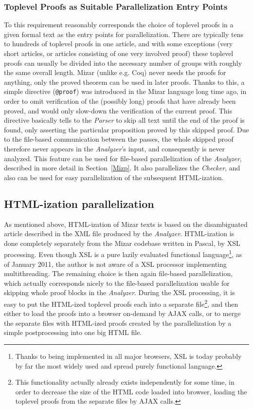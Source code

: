 \documentclass{llncs}
\begin{document}
\subsubsection{Toplevel Proofs as Suitable Parallelization Entry Points}
To this requirement reasonably corresponds the choice of toplevel
proofs in a given formal text as the entry points for
parallelization. There are typically tens to hundreds of toplevel
proofs in one article, and with some exceptions (very short articles,
or articles consisting of one very involved proof) these toplevel
proofs can usually be divided into the necessary number of groups with
roughly the same overall length. Mizar (unlike e.g. Coq) never needs
the proofs for anything, only the proved theorem can be used in later
proofs. Thanks to this, a simple directive ({\tt @proof}) was
introduced in the Mizar language long time ago, in order to omit
verification of the (possibly long) proofs that have already been
proved, and would only slow-down the verification of the current
proof. This directive basically tells to the \emph{Parser} to skip all
text until the end of the proof is found, only asserting the
particular proposition proved by this skipped proof. Due to the
file-based communication between the passes, the whole skipped proof
therefore never appears in the \emph{Analyzer}'s input, and
consequently is never analyzed. This feature can be used for 
file-based parallelization of the \emph{Analyzer}, described in more
detail in Section~\ref{Mizp}. It also parallelizes the \emph{Checker},
and also can be used for easy parallelization of the subsequent
HTML-ization.

\subsection{HTML-ization parallelization}
\label{HTML}
As mentioned above, HTML-ization of Mizar texts is based on the
disambiguated article described in the XML file produced by the
\emph{Analyzer}. HTML-ization is done completely separately from the
Mizar codebase written in Pascal, by XSL processing. Even though XSL
is a pure lazily evaluated functional language\footnote{Thanks to
  being implemented in all major browsers, XSL is today probably by
  far the most widely used and spread purely functional language.}, as
of January 2011, the author is not aware of a XSL processor
implementing multithreading. The remaining choice is then again
file-based parallelization, which actually corresponds nicely to the
file-based parallelization usable for skipping whole proof blocks in
the \emph{Analyzer}. During the XSL processing, it is easy to put the
HTML-ized toplevel proofs each into a separate file\footnote{This
  functionality actually already exists independently for some time,
  in order to decrease the size of the HTML code loaded into browser,
  loading the toplevel proofs from the separate files by AJAX calls.},
and then either to load the proofs into a browser on-demand by AJAX
calls, or to merge the separate files with HTML-ized proofs created by
the parallelization by a simple postprocessing into one big HTML file.
\end{document}
